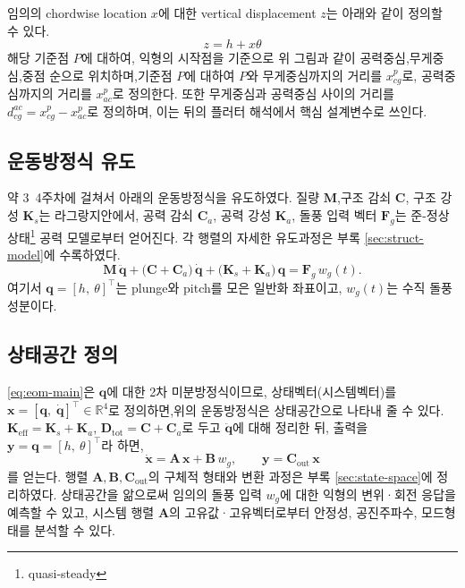 \documentclass[
	a4paper, %
	10pt, %
]{CSUniSchoolLabReport}
\begin{document}
임의의 chordwise location \(x\)에 대한 vertical displacement \(z\)는 아래와 같이 정의할 수 있다.
\begin{equation}\label{eq:kin}
    z = h +  x\theta
\end{equation}
해당 기준점 \(P\)에 대하여, 익형의 시작점을 기준으로 위 그림과 같이 공력중심,무게중심,중점 순으로 위치하며,기준점 \(P\)에 대하여
\(P\)와 무게중심까지의 거리를 \(x_{cg}^{p}\)로, 공력중심까지의 거리를 \(x_{ac}^{p}\)로 정의한다. 또한 무게중심과 공력중심 사이의 거리를
\(d_{cg}^{ac}=x_{cg}^{p}-x_{ac}^{p}\)로 정의하며, 이는 뒤의 플러터 해석에서 핵심 설계변수로 쓰인다.

\subsection{운동방정식 유도}
약 3~4주차에 걸쳐서 아래의 운동방정식을 유도하였다. 질량 \(\mathbf M\),구조 감쇠 \(\mathbf C\),
구조 강성 \(\mathbf K_s\)는 라그랑지안에서, 공력 감쇠 \(\mathbf C_a\), 공력 강성 \(\mathbf K_a\),
돌풍 입력 벡터 \(\mathbf F_g\)는 준-정상상태\footnote{quasi-steady} 공력 모델로부터 얻어진다. 각 행렬의 자세한
유도과정은 부록 \cref{sec:struct-model}에 수록하였다.
\begin{equation}\label{eq:eom-main}
    \boxed{\ \mathbf M\,\ddot{\mathbf q}
        + \big(\mathbf C + \mathbf C_a\big)\,\dot{\mathbf q}
        + \big(\mathbf K_s + \mathbf K_a\big)\,\mathbf q
        = \mathbf F_g\, w_g(t).\ }
\end{equation}
여기서 \(\mathbf q = [h,\ \theta]^\top\)는 plunge와 pitch를 모은 일반화 좌표이고,
\(w_g(t)\)는 수직 돌풍 성분이다.

\subsection{상태공간 정의}
\eqref{eq:eom-main}은 \(\mathbf q\)에 대한 2차 미분방정식이므로, 상태벡터(시스템벡터)를
\(\mathbf{x} = [\mathbf{q},\;\dot{\mathbf{q}}]^\top \in \mathbb{R}^4\)로 정의하면,위의 운동방정식은
상태공간으로 나타내 줄 수 있다. \(\mathbf{K}_{\text{eff}} = \mathbf{K}_s + \mathbf{K}_a\),
\(\mathbf{D}_{\text{tot}} = \mathbf{C} + \mathbf{C}_a\)로 두고 \(\ddot{\mathbf q}\)에 대해 정리한 뒤,
출력을 \(\mathbf y = \mathbf q = [h,\ \theta]^\top\)라 하면,
\begin{equation}
    \boxed{
    \dot{\mathbf{x}} = \mathbf{A}\,\mathbf{x} + \mathbf{B}\,w_g,
    \qquad
    \mathbf{y} = \mathbf{C}_{\text{out}}\,\mathbf{x}
    }
\end{equation}
를 얻는다. 행렬 \(\mathbf A,\mathbf B,\mathbf C_{\text{out}}\)의 구체적 형태와 변환 과정은
부록 \cref{sec:state-space}에 정리하였다. 상태공간을 앎으로써 임의의 돌풍 입력 \(w_g\)에 대한
익형의 변위·회전 응답을 예측할 수 있고, 시스템 행렬 \(\mathbf A\)의 고유값·고유벡터로부터
안정성, 공진주파수, 모드형태를 분석할 수 있다.
\end{document}
